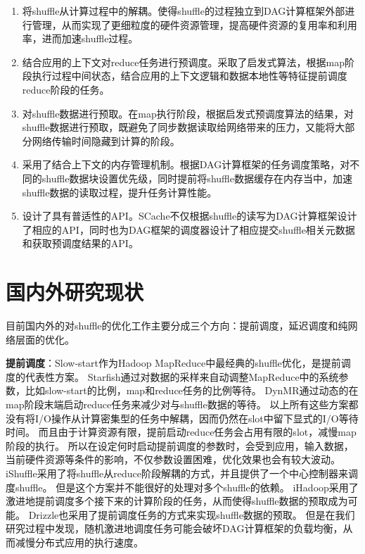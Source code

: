 \begin{enumerate}
	\item 将shuffle从计算过程中的解耦。使得shuffle的过程独立到DAG计算框架外部进行管理，从而实现了更细粒度的硬件资源管理，提高硬件资源的复用率和利用率，进而加速shuffle过程。
	\item 结合应用的上下文对reduce任务进行预调度。采取了启发式算法，根据map阶段执行过程中间状态，结合应用的上下文逻辑和数据本地性等特征提前调度reduce阶段的任务。
	\item 对shuffle数据进行预取。在map执行阶段，根据启发式预调度算法的结果，对shuffle数据进行预取，既避免了同步数据读取给网络带来的压力，又能将大部分网络传输时间隐藏到计算的阶段。
	\item 采用了结合上下文的内存管理机制。根据DAG计算框架的任务调度策略，对不同的shuffle数据块设置优先级，同时提前将shuffle数据缓存在内存当中，加速shuffle数据的读取过程，提升任务计算性能。
	\item 设计了具有普适性的API。SCache不仅根据shuffle的读写为DAG计算框架设计了相应的API，同时也为DAG框架的调度器设计了相应提交shuffle相关元数据和获取预调度结果的API。
\end{enumerate}

\section{国内外研究现状}
\label{sec:relatedwork}

目前国内外的对shuffle的优化工作主要分成三个方向：提前调度，延迟调度和纯网络层面的优化。

\textbf{提前调度}：Slow-start作为Hadoop MapReduce\cite{hadoop}中最经典的shuffle优化，是提前调度的代表性方案。
Starfish\cite{starfish}通过对数据的采样来自动调整MapReduce中的系统参数，比如slow-start的比例，map和reduce任务的比例等待。
DynMR\cite{dynmr}通过动态的在map阶段末端启动reduce任务来减少对与shuffle数据的等待。
以上所有这些方案都没有将I/O操作从计算密集型的任务中解耦，因而仍然在slot中留下显式的I/O等待时间。
而且由于计算资源有限，提前启动reduce任务会占用有限的slot，减慢map阶段的执行。
所以在设定何时启动提前调度的参数时，会受到应用，输入数据，当前硬件资源等条件的影响，不仅参数设置困难，优化效果也会有较大波动。
iShuffle\cite{ishuffle}采用了将shuffle从reduce阶段解耦的方式，并且提供了一个中心控制器来调度shuffle。
但是这个方案并不能很好的处理对多个shuffle的依赖。
iHadoop\cite{ihadoop}采用了激进地提前调度多个接下来的计算阶段的任务，从而使得shuffle数据的预取成为可能。
Drizzle\cite{drizzle}也采用了提前调度任务的方式来实现shuffle数据的预取。
但是在我们研究过程中发现，随机激进地调度任务可能会破坏DAG计算框架的负载均衡，从而减慢分布式应用的执行速度。

